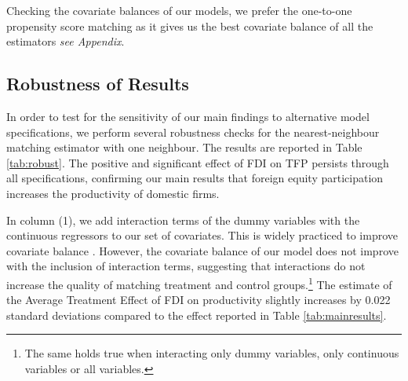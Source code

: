 \documentclass[a4paper,11pt]{scrartcl}
\begin{document}
Checking the covariate balances of our models, we prefer the one-to-one propensity score matching as it gives us the best covariate balance of all the estimators \textit{see Appendix}. %


\subsection{Robustness of Results}

In order to test for the sensitivity of our main findings to alternative model specifications, we perform several robustness checks for the nearest-neighbour matching estimator with one neighbour. The results are reported in Table \ref{tab:robust}. The positive and significant effect of FDI on TFP persists through all specifications, confirming our main results that foreign equity participation increases the productivity of domestic firms. 

In column (1), we add interaction terms of the dummy variables with the continuous regressors to our set of covariates. This is widely practiced to improve covariate balance \citep{Caliendo08}.
However, the covariate balance of our model does not improve with the inclusion of interaction terms, suggesting that interactions do not increase the quality of matching treatment and control groups.\footnote{The same holds true when interacting only dummy variables, only continuous variables or all variables.} The estimate of the Average Treatment Effect of FDI on productivity slightly increases by 0.022 standard deviations compared to the effect reported in Table \ref{tab:mainresults}. 
\end{document}
